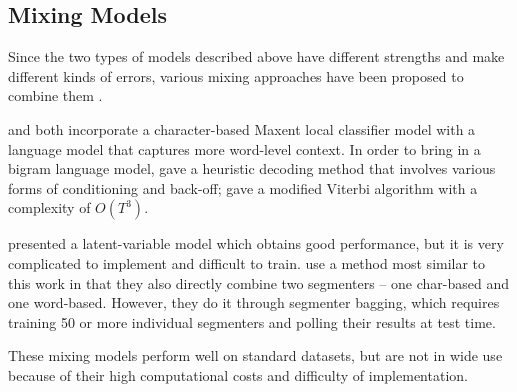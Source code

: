 %
% 

\subsection{Mixing Models} Since the two types of models described above have different strengths and make different kinds of errors, various mixing approaches have been proposed to combine them \cite{Wang:2006:SIGHAN,Lin:2009:CICLing,Sun:2009:HLT-NAACL,Sun:2010:COLING,Wang:2010:COLING}. 


\cite{Lin:2009:CICLing} and \cite{Wang:2006:SIGHAN} both incorporate a character-based Maxent local classifier model with a language model that captures more word-level context.
In order to bring in a bigram language model,   gave a heuristic decoding method that involves various forms of conditioning and back-off;  gave a modified Viterbi algorithm with a complexity of $O(T^3)$. 

\cite{Sun:2009:HLT-NAACL} presented a latent-variable model which obtains good performance, but it is very complicated to implement and difficult to train. 
\cite{Sun:2009:HLT-NAACL} use a method most similar to this work in that they also directly combine two segmenters -- one char-based and one word-based. However, they do it through segmenter bagging, which requires training 50 or more individual segmenters and polling their results at test time. 

These mixing models perform well on standard datasets, but are not in wide use because of their high computational costs and difficulty of implementation.